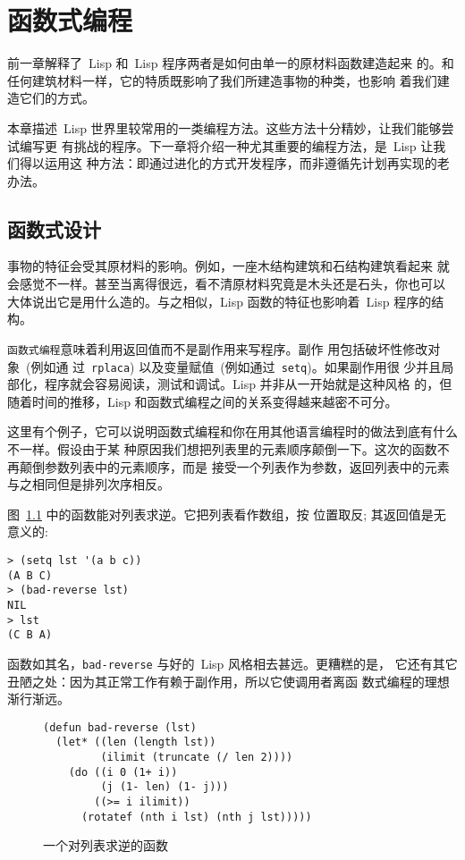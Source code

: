 
\chapter{函数式编程}
\label{chap:functional_programming}

前一章解释了~Lisp 和~Lisp 程序两者是如何由单一的原材料\pozhehao{}函数\pozhehao{}建造起来
的。和任何建筑材料一样，它的特质既影响了我们所建造事物的种类，也影响
着我们建造它们的方式。

本章描述~Lisp 世界里较常用的一类编程方法。这些方法十分精妙，让我们能够尝试编写更
有挑战的程序。下一章将介绍一种尤其重要的编程方法，是~Lisp 让我们得以运用这
种方法：即通过进化的方式开发程序，而非遵循先计划再实现的老办法。

\section{函数式设计}
\label{sec:functional_design}

事物的特征会受其原材料的影响。例如，一座木结构建筑和石结构建筑看起来
就会感觉不一样。甚至当离得很远，看不清原材料究竟是木头还是石头，你也可以
大体说出它是用什么造的。与之相似，Lisp 函数的特征也影响着~Lisp 程序的结构。

\verb|函数式编程|意味着利用返回值而不是副作用来写程序。副作
用包括破坏性修改对象~(例如通
过~\verb|rplaca|) 以及变量赋值~(例如通过~\verb|setq|)。如果副作用很
少并且局部化，程序就会容易阅读，测试和调试。Lisp 并非从一开始就是这种风格
的，但随着时间的推移，Lisp 和函数式编程之间的关系变得越来越密不可分。

这里有个例子，它可以说明函数式编程和你在用其他语言编程时的做法到底有什么不一样。假设由于某
种原因我们想把列表里的元素顺序颠倒一下。这次的函数不再颠倒参数列表中的元素顺序，而是
接受一个列表作为参数，返回列表中的元素与之相同但是排列次序相反。

图~\ref{fig:bad-reverse} 中的函数能对列表求逆。它把列表看作数组，按
位置取反; 其返回值是无意义的:
\begin{lstlisting}
> (setq lst '(a b c))
(A B C)
> (bad-reverse lst)
NIL
> lst
(C B A)
\end{lstlisting}
函数如其名，\verb|bad-reverse| 与好的~Lisp 风格相去甚远。更糟糕的是，
它还有其它丑陋之处：因为其正常工作有赖于副作用，所以它使调用者离函
数式编程的理想渐行渐远。

\begin{figure}
\begin{lstlisting}
(defun bad-reverse (lst)
  (let* ((len (length lst))
         (ilimit (truncate (/ len 2))))
    (do ((i 0 (1+ i))
         (j (1- len) (1- j)))
        ((>= i ilimit))
      (rotatef (nth i lst) (nth j lst)))))
\end{lstlisting}
\caption{\label{fig:bad-reverse}一个对列表求逆的函数}
\end{figure}

